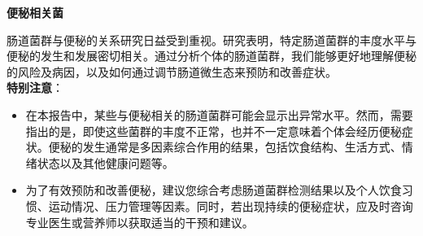 \documentclass[UTF8]{ctexart}
\begin{document}
\begin{center}
\end{center}


\newpage

\begin{tcolorbox}[
    enhanced,
    colback=white,
    colframe=white,
    arc=2mm,
    boxrule=0pt,
    width=\textwidth,
    left=15pt,
    right=15pt,
    top=10pt,
    bottom=10pt,
    drop shadow={
        opacity=0.2,
        color=customTeal
    },
    borderline west={5pt}{0pt}{customTeal}
]
\textcolor{customTeal}{\Large\textbf{便秘相关菌}}
\end{tcolorbox}

\begin{tcolorbox}[
    enhanced,
    colback=customTealBg,
    colframe=customTealBg,
    arc=3mm,
    boxrule=0pt,
    width=\textwidth,
    top=8pt,
    bottom=8pt
]
{\small{\color{customTeal}\faInfoCircle} 肠道菌群与便秘的关系研究日益受到重视。研究表明，特定肠道菌群的丰度水平与便秘的发生和发展密切相关。通过分析个体的肠道菌群，我们能够更好地理解便秘的风险及病因，以及如何通过调节肠道微生态来预防和改善症状。\\

{\color{orange}\faExclamationTriangle} \textbf{特别注意}：
\begin{itemize}
    \item 在本报告中，某些与便秘相关的肠道菌群可能会显示出异常水平。然而，需要指出的是，即使这些菌群的丰度不正常，也并不一定意味着个体会经历便秘症状。便秘的发生通常是多因素综合作用的结果，包括饮食结构、生活方式、情绪状态以及其他健康问题等。
    \item 为了有效预防和改善便秘，建议您综合考虑肠道菌群检测结果以及个人饮食习惯、运动情况、压力管理等因素。同时，若出现持续的便秘症状，应及时咨询专业医生或营养师以获取适当的干预和建议。
\end{itemize}
}
\end{tcolorbox}
\end{document}
